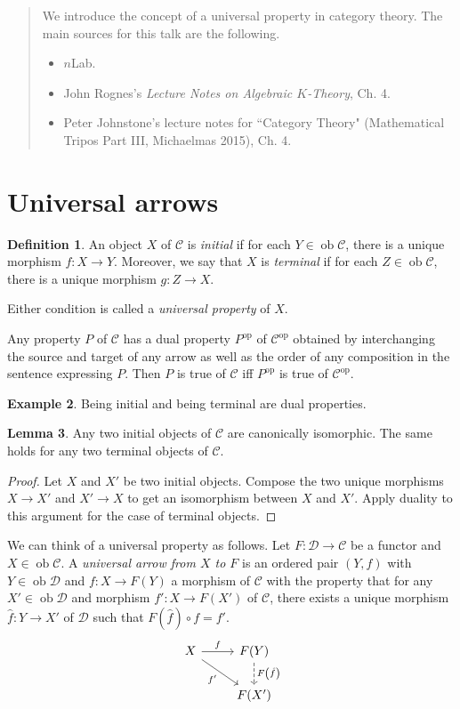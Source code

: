 \documentclass[10pt,letterpaper,cm]{nupset}
\theoremstyle{definition}
\newtheorem{definition}{Definition}[section]
\newtheorem{exmp}[definition]{Example}
\theoremstyle{theorem}
\newtheorem{lemma}[definition]{Lemma}
\theoremstyle{remark}
\newcommand{\1}{\mathbf{1}}
\renewcommand{\c}{\mathscr{C}}
\renewcommand{\d}{\mathscr{D}}
\newcommand{\0}{\vec 0}
\DeclareMathOperator{\op}{op}
\DeclareMathOperator{\ob}{ob}
\begin{document}
\begin{abstract}
We  introduce the concept of a universal property in category theory. The main sources for this talk are the following.
\begin{itemize}
\item $n$Lab.
\item John Rognes's \textit{Lecture Notes on Algebraic $K$-Theory}, Ch. 4.
\item Peter Johnstone's lecture notes for ``Category Theory" (Mathematical Tripos Part III, Michaelmas 2015), Ch. 4.
\end{itemize}
\end{abstract}

\smallskip

\section{Universal arrows}

\begin{definition}
An object $X$ of $\c$ is \textit{initial} if for each $Y \in \ob \c$, there is a unique morphism $f : X \to Y$. Moreover, we say that $X$ is \textit{terminal} if for each $Z \in \ob \c$, there is a unique morphism $g : Z \to X$. 

Either condition is called a \textit{universal property} of $X$.
\end{definition}


Any property $P$ of $\c$ has a dual property $P^{\op}$ of $\c^{\op}$ obtained by interchanging the source and target of any arrow as well as the order of any composition in the sentence expressing $P$. Then $P$ is true of $\c$ iff $P^{\op}$ is true of $\c^{\op}$.


\begin{exmp}
Being initial and being terminal are dual properties.
\end{exmp}

\begin{lemma}\label{initial}
Any two initial objects of $\c$ are canonically isomorphic. The same holds for any two terminal objects of $\c$.
\end{lemma}
\begin{proof}
Let $X$ and $X'$ be two initial objects. Compose the two unique morphisms $X\to X'$ and $X'\to X$ to get an isomorphism between $X$ and $X'$. Apply duality to this argument for the case of terminal objects.
\end{proof}


We can think of a universal property as follows.  Let $F : \d \to \c$ be a functor and $X \in \ob \c$. A \textit{universal arrow from $X$ to $F$} is an ordered pair $\left(Y, f\right)$ with $Y \in \ob \d$ and $f : X \to F(Y)$ a morphism of $\c$ with the property that for any $X' \in \ob \d$ and morphism $f' : X \to F(X')$ of $\c$, there exists a unique morphism $\hat{f} : Y \to X'$ of $\d$ such that $F\left(\hat{f}\right) \circ f = f'$.
\[ \begin{tikzcd}
X \arrow[r, "f"] \arrow[swap, dr,  " f' "] & F(Y) \arrow[d, dashed, "F\left(\hat{f}\right)"] \\%
 & F(X')
\end{tikzcd}
\]
\end{document}
